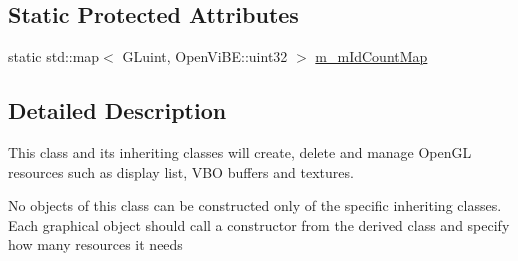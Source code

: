 \subsection*{Static Protected Attributes}
\begin{DoxyCompactItemize}
\item 
static std::map$<$ GLuint, OpenViBE::uint32 $>$ \hyperlink{classOpenViBEApplications_1_1OpenGLResourceManager_a5dfc8286721f8ec13adc4a0f7209e3e4}{m\_\-mIdCountMap}
\end{DoxyCompactItemize}


\subsection{Detailed Description}
This class and its inheriting classes will create, delete and manage OpenGL resources such as display list, VBO buffers and textures.\par
 No objects of this class can be constructed only of the specific inheriting classes. Each graphical object should call a constructor from the derived class and specify how many resources it needs 

